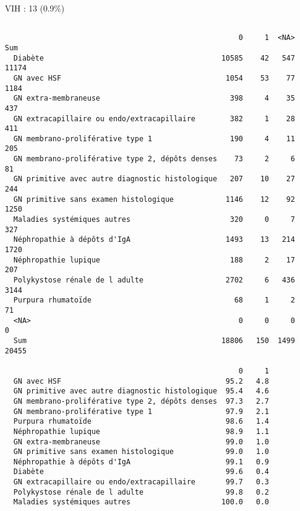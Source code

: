 \documentclass[11pt,a4paper]{article}\usepackage[]{graphicx}\usepackage[]{color}
\makeatletter
\newenvironment{kframe}{%
 \def\at@end@of@kframe{}%
 \ifinner\ifhmode%
  \def\at@end@of@kframe{\end{minipage}}%
  \begin{minipage}{\columnwidth}%
 \fi\fi%
 \def\FrameCommand##1{\hskip\@totalleftmargin \hskip-\fboxsep
 \colorbox{shadecolor}{##1}\hskip-\fboxsep
     \hskip-\linewidth \hskip-\@totalleftmargin \hskip\columnwidth}%
 \MakeFramed {\advance\hsize-\width
   \@totalleftmargin\z@ \linewidth\hsize
   \@setminipage}}%
 {\par\unskip\endMakeFramed%
 \at@end@of@kframe}
\newenvironment{knitrout}{}{} %
\makeatother
\begin{document}
VIH : 13 (0.9\%)
\begin{knitrout}
\color{fgcolor}\begin{kframe}
\begin{verbatim}
                                                 
                                                      0     1  <NA>   Sum
  Diabète                                         10585    42   547 11174
  GN avec HSF                                      1054    53    77  1184
  GN extra-membraneuse                              398     4    35   437
  GN extracapillaire ou endo/extracapillaire        382     1    28   411
  GN membrano-proliférative type 1                  190     4    11   205
  GN membrano-proliférative type 2, dépôts denses    73     2     6    81
  GN primitive avec autre diagnostic histologique   207    10    27   244
  GN primitive sans examen histologique            1146    12    92  1250
  Maladies systémiques autres                       320     0     7   327
  Néphropathie à dépôts d'IgA                      1493    13   214  1720
  Néphropathie lupique                              188     2    17   207
  Polykystose rénale de l adulte                   2702     6   436  3144
  Purpura rhumatoïde                                 68     1     2    71
  <NA>                                                0     0     0     0
  Sum                                             18806   150  1499 20455
                                                 
                                                      0     1
  GN avec HSF                                      95.2   4.8
  GN primitive avec autre diagnostic histologique  95.4   4.6
  GN membrano-proliférative type 2, dépôts denses  97.3   2.7
  GN membrano-proliférative type 1                 97.9   2.1
  Purpura rhumatoïde                               98.6   1.4
  Néphropathie lupique                             98.9   1.1
  GN extra-membraneuse                             99.0   1.0
  GN primitive sans examen histologique            99.0   1.0
  Néphropathie à dépôts d'IgA                      99.1   0.9
  Diabète                                          99.6   0.4
  GN extracapillaire ou endo/extracapillaire       99.7   0.3
  Polykystose rénale de l adulte                   99.8   0.2
  Maladies systémiques autres                     100.0   0.0
\end{verbatim}
\end{kframe}
\end{knitrout}
\end{document}
